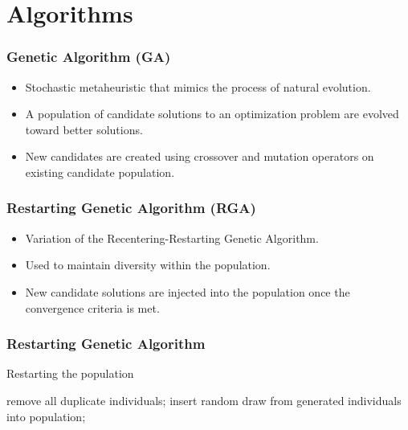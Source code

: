 \documentclass[10pt]{beamer}
\begin{document}
\section{Algorithms}

\begin{frame}
	\frametitle{Genetic Algorithm (GA)}

	\begin{itemize}
		\item Stochastic metaheuristic that mimics the process of natural evolution.
		\item A population of candidate solutions to an optimization problem are evolved toward better solutions.
		\item New candidates are created using crossover and mutation operators on existing candidate population.
	\end{itemize}
\end{frame}

\begin{frame}
	\frametitle{Restarting Genetic Algorithm (RGA)}

	\begin{itemize}
		\item Variation of the Recentering-Restarting Genetic Algorithm.
		\item Used to maintain diversity within the population.
		\item New candidate solutions are injected into the population once the convergence criteria is met.
	\end{itemize}
\end{frame}

\begin{frame}
	\frametitle{Restarting Genetic Algorithm}

	\begin{algorithm}[H]
		\caption{Restarting the population}
		\begin{algorithmic}[1]

		  \STATE remove all duplicate individuals;
		    \STATE insert random draw from generated individuals into population;
		  \ENDWHILE
		\ENDIF

		\end{algorithmic}
	\end{algorithm}

\end{frame}
\end{document}
